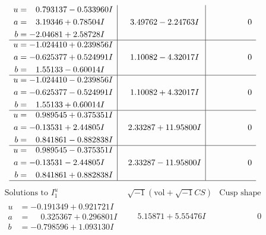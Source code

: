 \documentclass[1p]{elsarticle_modified}
\theoremstyle{definition}
\newcommand{\I}{\sqrt{-1}}
\begin{document}
$$\begin{array}{c|c|c}
\begin{aligned}
u &= \phantom{-}0.793137 - 0.533960 I \\
a &= \phantom{-}3.19346 + 0.78504 I \\
b &= -2.04681 + 2.58728 I\end{aligned}
 & \phantom{-}3.49762 - 2.24763 I & \phantom{-0.000000 } 0 \\ \hline\begin{aligned}
u &= -1.024410 + 0.239856 I \\
a &= -0.625377 + 0.524991 I \\
b &= \phantom{-}1.55133 - 0.60014 I\end{aligned}
 & \phantom{-}1.10082 - 4.32017 I & \phantom{-0.000000 } 0 \\ \hline\begin{aligned}
u &= -1.024410 - 0.239856 I \\
a &= -0.625377 - 0.524991 I \\
b &= \phantom{-}1.55133 + 0.60014 I\end{aligned}
 & \phantom{-}1.10082 + 4.32017 I & \phantom{-0.000000 } 0 \\ \hline\begin{aligned}
u &= \phantom{-}0.989545 + 0.375351 I \\
a &= -0.13531 + 2.44805 I \\
b &= \phantom{-}0.841861 - 0.882838 I\end{aligned}
 & \phantom{-}2.33287 + 11.95800 I & \phantom{-0.000000 } 0 \\ \hline\begin{aligned}
u &= \phantom{-}0.989545 - 0.375351 I \\
a &= -0.13531 - 2.44805 I \\
b &= \phantom{-}0.841861 + 0.882838 I\end{aligned}
 & \phantom{-}2.33287 - 11.95800 I & \phantom{-0.000000 } 0\\
 \hline 
 \end{array}$$\newpage$$\begin{array}{c|c|c}  
\text{Solutions to }I^u_{1}& \I (\text{vol} + \sqrt{-1}CS) & \text{Cusp shape}\\
 \hline 
\begin{aligned}
u &= -0.191349 + 0.921721 I \\
a &= \phantom{-}0.325367 + 0.296801 I \\
b &= -0.798596 + 1.093130 I\end{aligned}
 & \phantom{-}5.15871 + 5.55476 I & \phantom{-0.000000 } 0 \\ \hline\begin{aligned}

\end{aligned}
\end{array}$$
\end{document}
